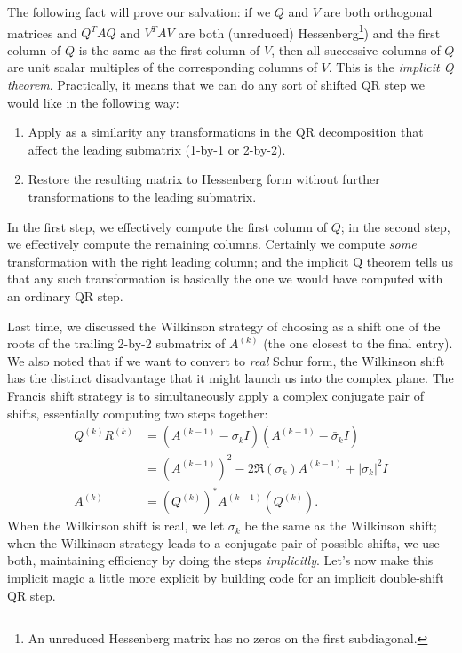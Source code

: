 \documentclass[12pt, leqno]{article} %
\begin{document}
The following fact will prove our salvation: if we $Q$ and $V$ are
both orthogonal matrices and $Q^T A Q$ and $V^T A V$ are both
(unreduced) Hessenberg\footnote{ An unreduced Hessenberg matrix has no
  zeros on the first subdiagonal.  })  and the first column of $Q$ is
the same as the first column of $V$, then all successive columns of
$Q$ are unit scalar multiples of the corresponding columns of $V$.
This is the {\em implicit Q theorem}.  Practically, it means that we
can do any sort of shifted QR step we would like in the following way:
\begin{enumerate}
\item
  Apply as a similarity any transformations in the QR decomposition
  that affect the leading submatrix (1-by-1 or 2-by-2).
\item
  Restore the resulting matrix to Hessenberg form without further
  transformations to the leading submatrix.
\end{enumerate}
In the first step, we effectively compute the first column of $Q$;
in the second step, we effectively compute the remaining columns.
Certainly we compute {\em some} transformation with the right leading
column; and the implicit Q theorem tells us that any such transformation
is basically the one we would have computed with an ordinary QR step.

Last time, we discussed the Wilkinson strategy of choosing as a shift
one of the roots of the trailing 2-by-2 submatrix of $A^{(k)}$ (the
one closest to the final entry).  We also noted that if we want to
convert to {\em real} Schur form, the Wilkinson shift has the distinct
disadvantage that it might launch us into the complex plane.  The
Francis shift strategy is to simultaneously apply a complex conjugate
pair of shifts, essentially computing two steps together:
\begin{align*}
  Q^{(k)} R^{(k)} &= (A^{(k-1)}-\sigma_k I)(A^{(k-1)}-\bar{\sigma}_k I) \\
                &= (A^{(k-1)})^2 - 2\Re(\sigma_k) A^{(k-1)} + |\sigma_k|^2 I \\
  A^{(k)}        &= (Q^{(k)})^* A^{(k-1)} (Q^{(k)}).
\end{align*}
When the Wilkinson shift is real, we let $\sigma_k$ be the same as the
Wilkinson shift; when the Wilkinson strategy leads to a conjugate pair
of possible shifts, we use both, maintaining efficiency by doing the
steps {\em implicitly}.  Let's now make this implicit magic a little
more explicit by building code for an implicit double-shift QR step.
\end{document}
